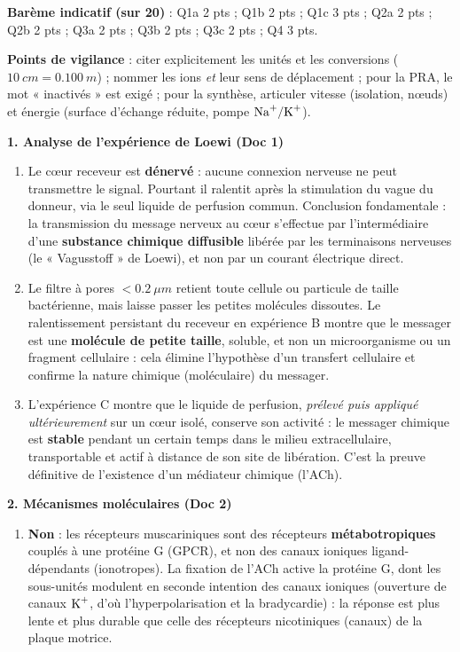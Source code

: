 \documentclass[11pt]{article}
\begin{document}
\begin{corrige}
\textbf{Barème indicatif (sur 20)} : Q1a 2 pts ; Q1b 2 pts ; Q1c 3 pts ; Q2a 2 pts ; Q2b 2 pts ; Q3a 2 pts ; Q3b 2 pts ; Q3c 2 pts ; Q4 3 pts.

\textbf{Points de vigilance} : citer explicitement les unités et les conversions ($\SI{10}{cm} = \SI{0,100}{m}$) ; nommer les ions \emph{et} leur sens de déplacement ; pour la PRA, le mot « inactivés » est exigé ; pour la synthèse, articuler vitesse (isolation, nœuds) et énergie (surface d'échange réduite, pompe $\ce{Na+/K+}$).
\end{corrige}

\begin{corrige}
\textbf{1. Analyse de l'expérience de Loewi (Doc 1)}
\begin{enumerate}
    \item[a)] Le cœur receveur est \textbf{dénervé} : aucune connexion nerveuse ne peut transmettre le signal. Pourtant il ralentit après la stimulation du vague du donneur, via le seul liquide de perfusion commun. Conclusion fondamentale : la transmission du message nerveux au cœur s'effectue par l'intermédiaire d'une \textbf{substance chimique diffusible} libérée par les terminaisons nerveuses (le « Vagusstoff » de Loewi), et non par un courant électrique direct.
    \item[b)] Le filtre à pores $< \SI{0,2}{\mu m}$ retient toute cellule ou particule de taille bactérienne, mais laisse passer les petites molécules dissoutes. Le ralentissement persistant du receveur en expérience B montre que le messager est une \textbf{molécule de petite taille}, soluble, et non un microorganisme ou un fragment cellulaire : cela élimine l'hypothèse d'un transfert cellulaire et confirme la nature chimique (moléculaire) du messager.
    \item[c)] L'expérience C montre que le liquide de perfusion, \emph{prélevé puis appliqué ultérieurement} sur un cœur isolé, conserve son activité : le messager chimique est \textbf{stable} pendant un certain temps dans le milieu extracellulaire, transportable et actif à distance de son site de libération. C'est la preuve définitive de l'existence d'un médiateur chimique (l'ACh).
\end{enumerate}
\textbf{2. Mécanismes moléculaires (Doc 2)}
\begin{enumerate}
    \item[a)] \textbf{Non} : les récepteurs muscariniques sont des récepteurs \textbf{métabotropiques} couplés à une protéine G (GPCR), et non des canaux ioniques ligand-dépendants (ionotropes). La fixation de l'ACh active la protéine G, dont les sous-unités modulent en seconde intention des canaux ioniques (ouverture de canaux $\ce{K+}$, d'où l'hyperpolarisation et la bradycardie) : la réponse est plus lente et plus durable que celle des récepteurs nicotiniques (canaux) de la plaque motrice.

\end{enumerate}
\end{corrige}
\end{document}
